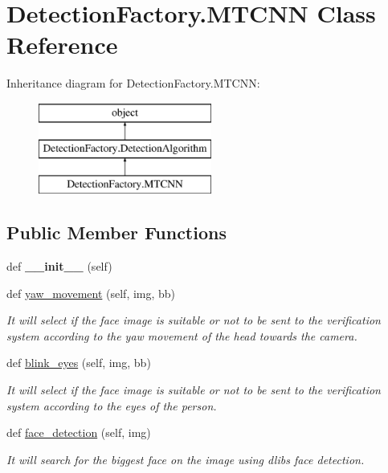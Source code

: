 \hypertarget{classDetectionFactory_1_1MTCNN}{}\section{Detection\+Factory.\+M\+T\+C\+NN Class Reference}
\label{classDetectionFactory_1_1MTCNN}
Inheritance diagram for Detection\+Factory.\+M\+T\+C\+NN\+:\begin{figure}[H]
\begin{center}
\leavevmode
\includegraphics[height=3.000000cm]{classDetectionFactory_1_1MTCNN}
\end{center}
\end{figure}
\subsection*{Public Member Functions}
\begin{DoxyCompactItemize}
\item 
def {\bfseries \+\_\+\+\_\+init\+\_\+\+\_\+} (self)\hypertarget{classDetectionFactory_1_1MTCNN_abb5e3f6589b98423f5ea579a303c999b}{}\label{classDetectionFactory_1_1MTCNN_abb5e3f6589b98423f5ea579a303c999b}

\item 
def \hyperlink{classDetectionFactory_1_1MTCNN_ac7d884cb82b4ac91212453121238e641}{yaw\+\_\+movement} (self, img, bb)
\begin{DoxyCompactList}\small\item\em It will select if the face image is suitable or not to be sent to the verification system according to the yaw movement of the head towards the camera. \end{DoxyCompactList}\item 
def \hyperlink{classDetectionFactory_1_1MTCNN_a879b84b1ec40bdd68775e7f2368bb856}{blink\+\_\+eyes} (self, img, bb)
\begin{DoxyCompactList}\small\item\em It will select if the face image is suitable or not to be sent to the verification system according to the eyes of the person. \end{DoxyCompactList}\item 
def \hyperlink{classDetectionFactory_1_1MTCNN_a10083feb0513bee3bdffca54ca1596be}{face\+\_\+detection} (self, img)
\begin{DoxyCompactList}\small\item\em It will search for the biggest face on the image using dlib\textquotesingle{}s face detection. \end{DoxyCompactList}\end{DoxyCompactItemize}
